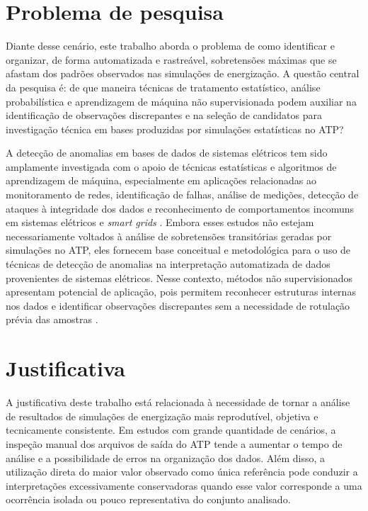 \documentclass[
	12pt,				%
	openright,			%
	oneside,			%
	a4paper,			%
	chapter=TITLE,		%
	section=TITLE,		%
	subsection=TITLE,	%
	subsubsection=TITLE,%
	english,			%
	brazilian			%
	]{abntex2}
\theoremstyle{definition}
\begin{document}
\section{Problema de pesquisa}

Diante desse cenário, este trabalho aborda o problema de como identificar e organizar, de forma automatizada e rastreável, sobretensões máximas que se afastam dos padrões observados nas simulações de energização. A questão central da pesquisa é: de que maneira técnicas de tratamento estatístico, análise probabilística e aprendizagem de máquina não supervisionada podem auxiliar na identificação de observações discrepantes e na seleção de candidatos para investigação técnica em bases produzidas por simulações estatísticas no ATP?

A detecção de anomalias em bases de dados de sistemas elétricos tem sido amplamente investigada com o apoio de técnicas estatísticas e algoritmos de aprendizagem de máquina, especialmente em aplicações relacionadas ao monitoramento de redes, identificação de falhas, análise de medições, detecção de ataques à integridade dos dados e reconhecimento de comportamentos incomuns em sistemas elétricos e \textit{smart grids} \cite{chandola2009,guato2024,ardebili2024,gillioz2026}. Embora esses estudos não estejam necessariamente voltados à análise de sobretensões transitórias geradas por simulações no ATP, eles fornecem base conceitual e metodológica para o uso de técnicas de detecção de anomalias na interpretação automatizada de dados provenientes de sistemas elétricos. Nesse contexto, métodos não supervisionados apresentam potencial de aplicação, pois permitem reconhecer estruturas internas nos dados e identificar observações discrepantes sem a necessidade de rotulação prévia das amostras \cite{guato2024,gillioz2026}.

\section{Justificativa}

A justificativa deste trabalho está relacionada à necessidade de tornar a análise de resultados de simulações de energização mais reprodutível, objetiva e tecnicamente consistente. Em estudos com grande quantidade de cenários, a inspeção manual dos arquivos de saída do ATP tende a aumentar o tempo de análise e a possibilidade de erros na organização dos dados. Além disso, a utilização direta do maior valor observado como única referência pode conduzir a interpretações excessivamente conservadoras quando esse valor corresponde a uma ocorrência isolada ou pouco representativa do conjunto analisado.
\end{document}
